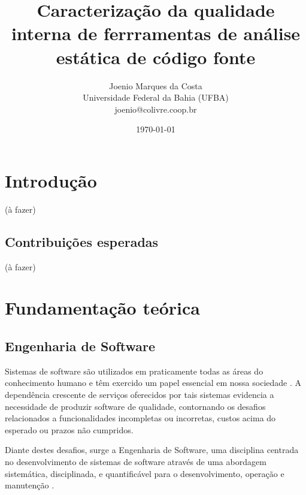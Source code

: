 \documentclass[12pt]{article}
\title{
  Caracterização da qualidade interna de ferrramentas de análise estática de
  código fonte
}
\author{Joenio Marques da Costa\\
  {\small Universidade Federal da Bahia (UFBA)} \\
  {\small joenio@colivre.coop.br}
}
\date{\today}
\begin{document}
\maketitle

\section{Introdução}

(à fazer)


\subsection{Contribuições esperadas}

(à fazer)

\section{Fundamentação teórica}

% 
% 
% 
% 

\subsection{Engenharia de Software}

Sistemas de software são utilizados em praticamente todas as áreas do
conhecimento humano e têm exercido um papel essencial em nossa sociedade
\cite{Mafra2006}. A dependência crescente de serviços oferecidos por tais
sistemas evidencia a necessidade de produzir software de qualidade,
contornando os  desafios relacionados a funcionalidades incompletas ou
incorretas, custos acima do esperado ou prazos não cumpridos.

Diante destes desafios, surge a Engenharia de Software, uma disciplina
centrada no desenvolvimento de sistemas de software \cite{Wohlin2012} através
de uma abordagem sistemática, disciplinada, e quantificável para o
desenvolvimento, operação e manutenção \cite{SWEBOK2014}.
\end{document}

